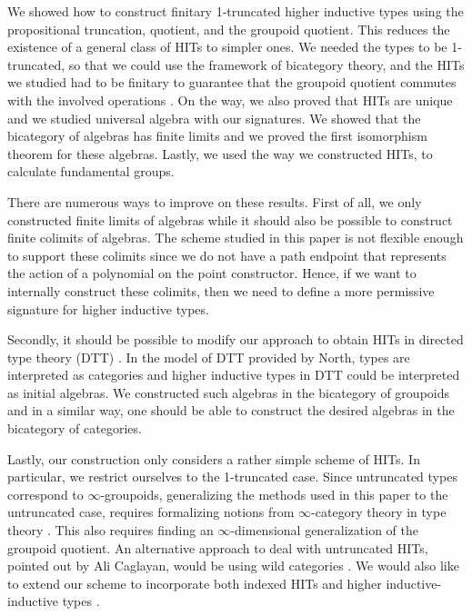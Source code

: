 We showed how to construct finitary 1-truncated higher inductive types using the propositional truncation, quotient, and the groupoid quotient.
This reduces the existence of a general class of HITs to simpler ones.
We needed the types to be 1-truncated, so that we could use the framework of bicategory theory,
and the HITs we studied had to be finitary to guarantee that the groupoid quotient
commutes with the involved operations \cite{DBLP:journals/mscs/ChapmanUV19}.
On the way, we also proved that HITs are unique and we studied universal algebra with our signatures.
We showed that the bicategory of algebras has finite limits and we proved the first isomorphism theorem for these algebras.
Lastly, we used the way we constructed HITs, to calculate fundamental groups.

There are numerous ways to improve on these results.
First of all, we only constructed finite limits of algebras while it should also be possible to construct finite colimits of algebras.
The scheme studied in this paper is not flexible enough to support these colimits since we do not have a path endpoint that represents the action of a polynomial on the point constructor.
Hence, if we want to internally construct these colimits, then we need to define a more permissive signature for higher inductive types.

Secondly, it should be possible to modify our approach to obtain HITs in directed type theory (DTT) \cite{north2019towards}.
In the model of DTT provided by North, types are interpreted as categories and higher inductive types in DTT could be interpreted as initial algebras.
We constructed such algebras in the bicategory of groupoids and in a similar way, one should be able to construct the desired algebras in the bicategory of categories.

Lastly, our construction only considers a rather simple scheme of HITs.
In particular, we restrict ourselves to the 1-truncated case. %
Since untruncated types correspond to $\infty$-groupoids,
generalizing the methods used in this paper to the untruncated case,
requires formalizing notions from $\infty$-category theory in type theory
\cite{DBLP:conf/csl/AltenkirchR12,DBLP:journals/pacmpl/CapriottiK18,FinsterM17}.
This also requires finding an $\infty$-dimensional generalization of the groupoid quotient.
An alternative approach to deal with untruncated HITs, pointed out by Ali Caglayan,
would be using wild categories \cite{DBLP:conf/tlca/HirschowitzHT15,KrausRaumer}.
We would also like to extend our scheme to incorporate both indexed HITs and higher inductive-inductive types \cite{CavalloH19,KaposiK18}.
